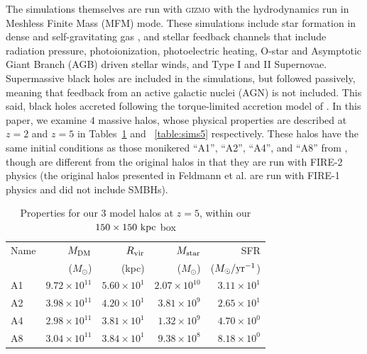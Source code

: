 The simulations themselves are run with \textsc{gizmo} \citep{Hopkins2015} with the hydrodynamics run in Meshless Finite Mass (MFM) mode.
These simulations include star formation in dense and self-gravitating gas \citep*{Hopkins2013}, and stellar feedback channels that include radiation pressure, photoionization, photoelectric heating, O-star and Asymptotic Giant Branch (AGB) driven stellar winds, and Type I and II Supernovae.
Supermassive black holes are included in the simulations, but followed passively, meaning that feedback from an active galactic nuclei (AGN) is not included.
This said, black holes accreted following the torque-limited accretion model of \citet{Anglesalcazar2017a,Anglesalcazar2017b}.
In this paper, we examine $4$ massive halos, whose physical properties are described at $z=2$ and $z=5$ in Tables~\ref{table:sims2} and ~\ref{table:sims5} respectively.
These halos have the same initial conditions as those monikered ``A1'', ``A2'', ``A4'', and ``A8'' from \citet{Feldmann2016}, though are different from the original halos in that they are run with FIRE-2 physics (the original halos presented in Feldmann et al. are run with FIRE-1 physics \citep{Hopkins2014} and did not include SMBHs).

\begin{table}
\caption{Properties for our 3 model halos at $z=5$, within our $150 \times 150\ \rm kpc$ box}
\centering
\begin{tabular}{l r r r r}
Name & $M_{\rm DM}$ & $R_{\rm vir}$ & $M_{\rm star}$ & SFR \\
   & ($M_\odot$) & (kpc) & ($M_\odot$) & ($M_\odot / \rm yr ^{-1}$)\\ \hline
A1 & $9.72\times 10^{11}$ & $5.60 \times 10^1$  & $2.07 \times 10^{10}$ & $3.11\times10^1$ \\ \hline
A2 & $3.98\times 10^{11}$ & $4.20 \times 10^1$  & $3.81 \times 10^{9}$ & $2.65\times10^1$ \\ \hline
A4 & $2.98\times 10^{11}$ & $3.81 \times 10^1$  & $1.32 \times 10^{9}$ & $4.70\times10^0$ \\ \hline
A8 & $3.04\times 10^{11}$ & $3.84 \times 10^1$ & $9.38 \times 10^{8}$ & $8.18\times10^0$ \\
\hline
\end{tabular}
\label{table:sims2}
\end{table}

